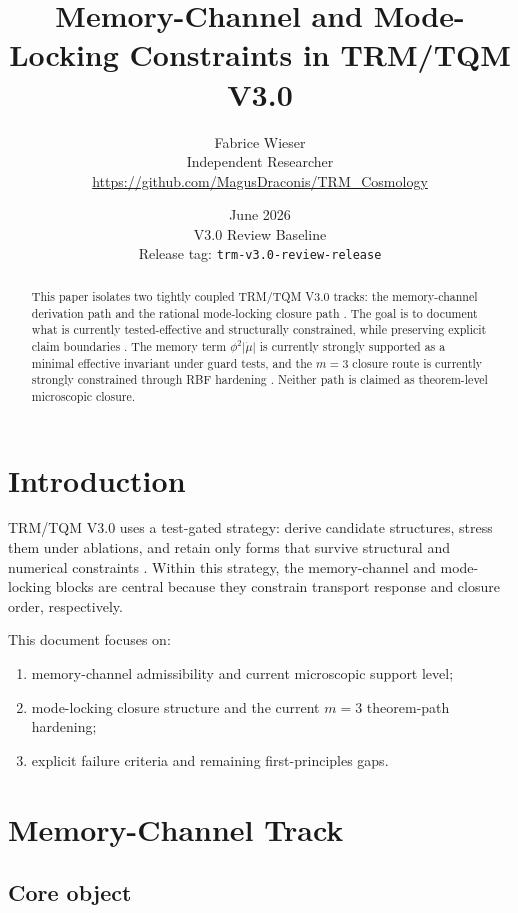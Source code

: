\documentclass[11pt,a4paper]{article}
\title{Memory-Channel and Mode-Locking Constraints in TRM/TQM V3.0}
\author{
Fabrice Wieser\\
Independent Researcher\\
\url{https://github.com/MagusDraconis/TRM_Cosmology}
}
\date{June 2026\\
V3.0 Review Baseline\\
Release tag: \texttt{trm-v3.0-review-release}}
\begin{document}
\maketitle

\begin{abstract}
This paper isolates two tightly coupled TRM/TQM V3.0 tracks: the memory-channel derivation path and the rational mode-locking closure path \cite{memory_derivation,m3_closure_path}. The goal is to document what is currently tested-effective and structurally constrained, while preserving explicit claim boundaries \cite{trm_status_v3}. The memory term \(\phi^2\lvert\dot{\mu}\rvert\) is currently strongly supported as a minimal effective invariant under guard tests, and the \(m=3\) closure route is currently strongly constrained through RBF hardening \cite{trm_memory_first_principles,trm_rational_band_first_principles}. Neither path is claimed as theorem-level microscopic closure.
\end{abstract}

\section{Introduction}

TRM/TQM V3.0 uses a test-gated strategy: derive candidate structures, stress them under ablations, and retain only forms that survive structural and numerical constraints \cite{trm_status_v3}. Within this strategy, the memory-channel and mode-locking blocks are central because they constrain transport response and closure order, respectively.

This document focuses on:
\begin{enumerate}
  \item memory-channel admissibility and current microscopic support level;
  \item mode-locking closure structure and the current \(m=3\) theorem-path hardening;
  \item explicit failure criteria and remaining first-principles gaps.
\end{enumerate}

\section{Memory-Channel Track}

\subsection{Core object}
\end{document}
